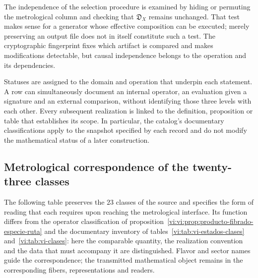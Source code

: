 The independence of the selection procedure is examined by hiding or
permuting the metrological column and checking that \(\mathfrak D_X\)
remains unchanged. That test makes sense for a generator whose
effective composition can be executed; merely preserving an output
file does not in itself constitute such a test. The cryptographic fingerprint
fixes which artifact is compared and makes modifications detectable, but
causal independence belongs to the operation and its dependencies.

Statuses are assigned to the domain and operation that underpin each
statement. A row can simultaneously document an internal operator,
an evaluation given a signature and an external comparison, without identifying
those three levels with each other. Every subsequent realization is linked to the
definition, proposition or table that establishes its scope. In particular, the
catalog's documentary classifications apply to the snapshot specified by
each record and do not modify the mathematical status of a later
construction.

\subsection{Metrological correspondence of the twenty-three classes}
\label{vi:subsec:vi-clases-metrologia}

The following table preserves the \(23\) classes of the source and specifies the
form of reading that each requires upon reaching the metrological interface. Its
function differs from the operator classification of
proposition~\ref{vi:vi:prop:producto-fibrado-especie-ruta} and the documentary
inventory of tables~\ref{vi:tab:vi-estados-clases} and~\ref{vi:tab:vi-clases}:
here the comparable quantity, the realization convention and
the data that must accompany it are distinguished. Flavor and sector names
guide the correspondence; the transmitted mathematical object remains in
the corresponding fibers, representations and readers.


